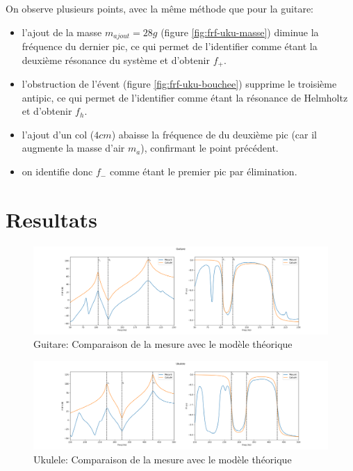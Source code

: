 \documentclass[atiam, article]{rapport} %
\begin{document}
On observe plusieurs points, avec la même méthode que pour la guitare:
\begin{itemize}
    \item l'ajout de la masse $m_{ajout} = 28 \si{g}$ (figure \ref{fig:frf-uku-masse}) diminue la fréquence du dernier pic, ce qui permet de l'identifier comme étant la deuxième résonance du système et d'obtenir $f_+$.
    \item l'obstruction de l'évent (figure \ref{fig:frf-uku-bouchee}) supprime le troisième antipic, ce qui permet de l'identifier comme étant la résonance de Helmholtz et d'obtenir $f_h$.
    \item l'ajout d'un col ($4\si{cm}$) abaisse la fréquence de du deuxième pic (car il augmente la masse d'air $m_a$), confirmant le point précédent.
    \item on identifie donc $f_-$ comme étant le premier pic par élimination.
\end{itemize}

\section{Resultats}

\begin{figure}
    \centering
    \includegraphics[width=\textwidth]{cordes/images/Guitare_comparaison_modele.png}
    \caption{Guitare: Comparaison de la mesure avec le modèle théorique}
    \label{fig:modele-guitare}
\end{figure}

\begin{figure}
    \centering
    \includegraphics[width=\textwidth]{cordes/images/Ukulele_comparaison_modele.png}
    \caption{Ukulele: Comparaison de la mesure avec le modèle théorique}
    \label{fig:modele-ukulele}
\end{figure}
\end{document}
